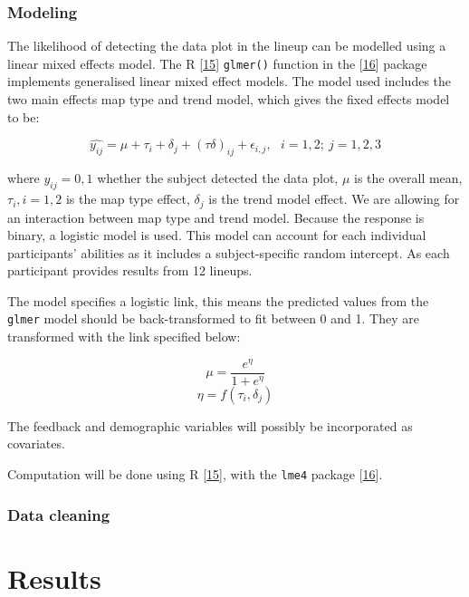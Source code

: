 \documentclass[conference,final,]{IEEEtran}
\begin{document}
\hypertarget{modeling}{%
\subsubsection{Modeling}\label{modeling}}

The likelihood of detecting the data plot in the lineup can be modelled using a linear mixed effects model.
The R {[}\protect\hyperlink{ref-RCore}{15}{]} \texttt{glmer()} function in the {[}\protect\hyperlink{ref-lme4}{16}{]} package implements generalised linear mixed effect models. The model used includes the two main effects map type and trend model, which gives the fixed effects model to be:

\[\widehat{y_{ij}} = \mu + \tau_i + \delta_j + (\tau\delta)_{ij} + \epsilon_{i,j}, ~~~ i=1,2; ~j=1,2,3\]

where \(y_{ij} = 0, 1\) whether the subject detected the data plot, \(\mu\) is the overall mean, \(\tau_i, i=1,2\) is the map type effect, \(\delta_j\) is the trend model effect. We are allowing for an interaction between map type and trend model. Because the response is binary, a logistic model is used. This model can account for each individual participants' abilities as it includes a subject-specific random intercept. As each participant provides results from 12 lineups.

The model specifies a logistic link, this means the predicted values from the \texttt{glmer} model should be back-transformed to fit between 0 and 1. They are transformed with the link specified below:

\[\mu = \frac{e^{\eta}}{1 + e^{\eta}}\] \label{eq:transform}
\[\eta = f(\tau_i,\delta_j)\]

The feedback and demographic variables will possibly be incorporated as covariates.

Computation will be done using R {[}\protect\hyperlink{ref-RCore}{15}{]}, with the \texttt{lme4} package {[}\protect\hyperlink{ref-lme4}{16}{]}.

\hypertarget{data-cleaning}{%
\subsubsection{Data cleaning}\label{data-cleaning}}

\hypertarget{results}{%
\section{Results}\label{results}}
\end{document}
